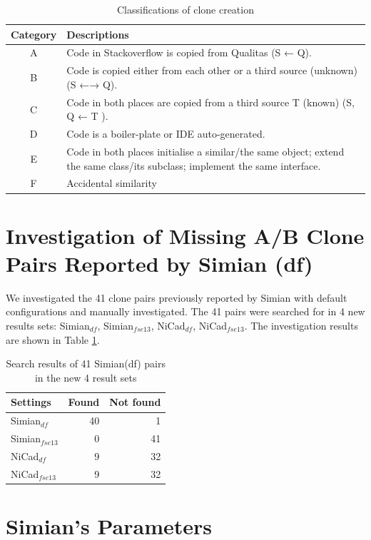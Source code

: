 \documentclass{IEEEtran}
\begin{document}
\begin{table}
	\centering
	\caption{Classifications of clone creation}
\begin{tabular}{|c|p{13cm}|}
	\hline 
	Category & Descriptions \\ 
	\hline 
	A & Code in Stackoverflow is copied from Qualitas (S ← Q). \\ 
	\hline 
	B & Code is copied either from each other or a third source (unknown) (S ←→ Q).
	\\ 
	\hline 
	C & Code in both places are copied from a third source T (known) (S, Q ← T ).
	\\ 
	\hline 
	D & Code is a boiler-plate or IDE auto-generated.
	\\ 
	\hline 
	E & Code in both places initialise a similar/the same object; extend the same class/its subclass; implement the same interface.
	\\ 
	\hline 
	F & Accidental similarity  \\ 
	\hline 
\end{tabular} 
\end{table}

\section*{Investigation of Missing A/B Clone Pairs Reported by Simian (df)}
We investigated the 41 clone pairs previously reported by Simian with default configurations and manually investigated. The 41 pairs were searched for in 4 new results sets: Simian$_{df}$, Simian$_{fse13}$, NiCad$_{df}$, NiCad$_{fse13}$. The investigation results are shown in Table \ref{tab:search}.

\begin{table}[H]
	\centering
	\caption{Search results of 41 Simian(df) pairs in the new 4 result sets}
	\label{tab:search}
\begin{tabular}{l|r|r}
	\hline 
	Settings & Found & Not found \\ 
	\hline 
	Simian$_{df}$  &  40 & 1 \\ 
	\hline 
	Simian$_{fse13}$ & 0 & 41  \\ 
	\hline 
	NiCad$_{df}$  & 9 & 32 \\ 
	\hline 
	NiCad$_{fse13}$ &  9 & 32 \\ 
	\hline 
\end{tabular} 
\end{table}

\section*{Simian's Parameters}
\end{document}
